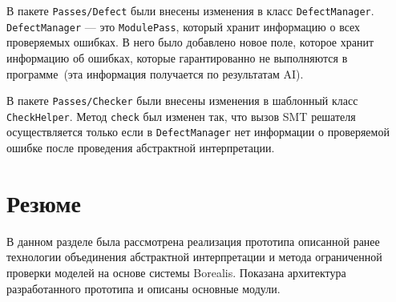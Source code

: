 В пакете \texttt{Passes/Defect} были внесены изменения в класс 
\texttt{DefectManager}. \texttt{DefectManager} --- это \texttt{ModulePass}, 
который хранит информацию о всех проверяемых ошибках. В него было добавлено
новое поле, которое хранит информацию об ошибках, которые гарантированно не выполняются в программе~(эта информация получается по результатам AI).

В пакете \texttt{Passes/Checker} были внесены изменения в шаблонный класс
\texttt{CheckHelper}. Метод \texttt{check} был изменен так, что вызов SMT решателя осуществляется только если в \texttt{DefectManager} нет информации
о проверяемой ошибке после проведения абстрактной интерпретации.

\section{Резюме}
В данном разделе была рассмотрена реализация прототипа описанной ранее 
технологии объединения абстрактной интерпретации и метода ограниченной проверки 
моделей на основе системы Borealis. Показана архитектура разработанного 
прототипа и описаны основные модули.
